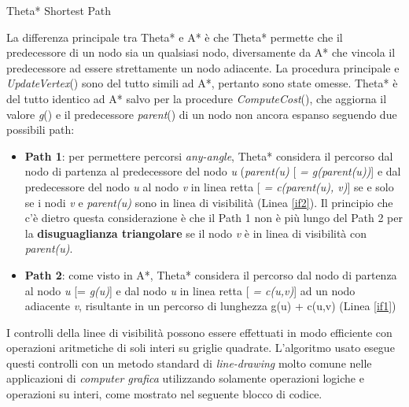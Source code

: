 \documentclass[11pt]{article}
\begin{document}
\begin{algorithm}
\PrintSemicolon
\caption{Theta* Shortest Path}
  \LinesNumbered
\setcounter{AlgoLine}{32}
\end{algorithm}

\par{
La differenza principale tra Theta* e  A* \`e che Theta* permette che il predecessore di un nodo sia un qualsiasi nodo, diversamente da A* che vincola il predecessore ad essere strettamente un nodo adiacente. La procedura principale e \emph{UpdateVertex}() sono del tutto simili ad A*, pertanto sono state omesse. Theta* \`e del tutto identico ad A* salvo per la procedure \emph{ComputeCost}(), che aggiorna il valore \emph{g}() e il predecessore \emph{parent}() di un nodo non ancora espanso seguendo due possibili path:
\begin{itemize}
\item \textbf{Path 1}: per permettere percorsi \emph{any-angle}, Theta* considera il percorso dal nodo di partenza al predecessore del nodo \emph{u} (\emph{parent(u)} [ \emph{= g(parent(u))}] e dal predecessore del nodo \emph{u} al nodo \emph{v} in linea retta [ \emph{= c(parent(u), v)}] se e solo se i nodi \emph{v} e \emph{parent(u)} sono in linea di visibilit\`a (Linea \ref{if2}). Il principio che c'\`e dietro questa considerazione \`e che il Path 1 non \`e pi\`u lungo del Path 2 per la \textbf{disuguaglianza triangolare} se il nodo \emph{v} \`e in linea di visibilit\`a con \emph{parent(u)}.
\item \textbf{Path 2}: come visto in A*, Theta* considera il percorso dal nodo di partenza al nodo \emph{u} [= \emph{g(u)}] e dal nodo \emph{u} in linea retta [ \emph{= c(u,v)}] ad un nodo adiacente \emph{v}, risultante in un percorso di lunghezza g(u) + c(u,v) (Linea \ref{if1})
\end{itemize}
}
\par{
I controlli della linee di visibilit\`a possono essere effettuati in modo efficiente con operazioni aritmetiche di soli interi su griglie quadrate. L'algoritmo usato esegue questi controlli con un metodo standard di \emph{line-drawing} molto comune nelle applicazioni di \emph{computer grafica} utilizzando solamente operazioni logiche e operazioni su interi, come mostrato nel seguente blocco di codice.}
\end{document}
